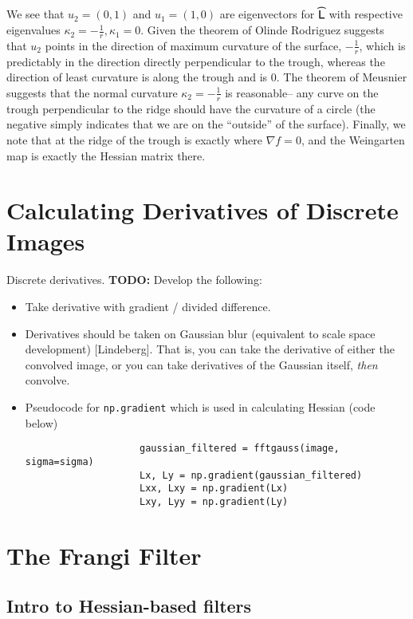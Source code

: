       We see that $u_2 = (0,1)$ and $u_1 = (1,0)$ are eigenvectors for $\widehat{\mathsf{L}}$ with respective eigenvalues
      $\kappa_2 = -\frac{1}{r} , \kappa_1 = 0$. Given the theorem of Olinde Rodriguez suggests that $u_2$ points in the direction of maximum curvature of the surface, $-\frac{1}{r}$, which is predictably in the direction directly perpendicular to the trough, whereas the direction of least curvature is along the trough and is $0$. The theorem of Meusnier suggests that the normal curvature $\kappa_2 = -\frac{1}{r}$ is reasonable-- any curve on the trough perpendicular to the ridge should have the curvature of a circle (the negative simply indicates that we are on the ``outside'' of the surface). Finally, we note that at the ridge of the trough is exactly where $\nabla f = 0$, and the Weingarten map is exactly the Hessian matrix there.
      
\section{Calculating Derivatives of Discrete Images} 
	Discrete derivatives. \maltese\textbf{TODO:} Develop the following:
	\begin{itemize}
		\item Take derivative with gradient / divided difference.
		\item Derivatives should be taken on Gaussian blur (equivalent to scale space development) [Lindeberg]. That is, you can take the derivative of either the convolved image, or you can take derivatives of the Gaussian itself, \textit{then} convolve.
		\item Pseudocode for \texttt{np.gradient} which is used in calculating Hessian (code below)
					\begin{verbatim}
					gaussian_filtered = fftgauss(image, sigma=sigma)
					Lx, Ly = np.gradient(gaussian_filtered)
					Lxx, Lxy = np.gradient(Lx)
					Lxy, Lyy = np.gradient(Ly)
					\end{verbatim}
				
		\end{itemize}



\hrulefill
\section{The Frangi Filter}


    \subsection{Intro to Hessian-based filters}


